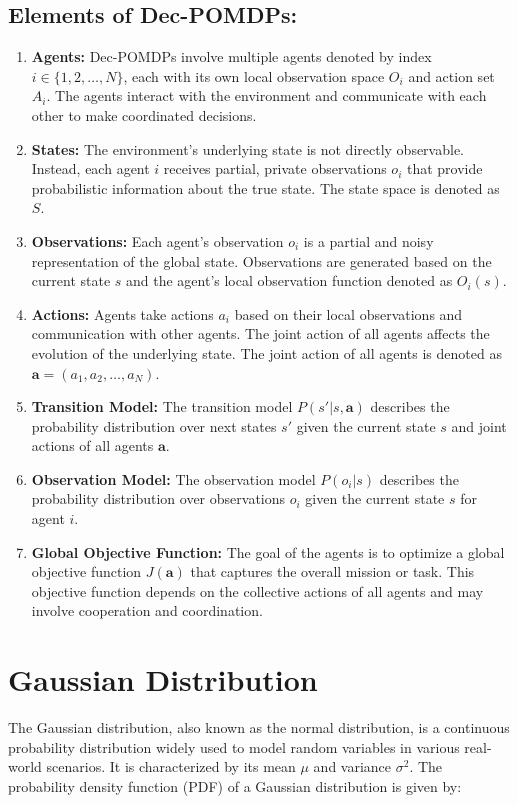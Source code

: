 \subsection{Elements of Dec-POMDPs:}\label{subsec:elements-of-dec-pomdps:}
\begin{enumerate}
    \item \textbf{Agents:} Dec-POMDPs involve multiple agents denoted by index $i \in \{1, 2, \ldots, N\}$, each with its own local observation space $O_i$ and action set $A_i$. The agents interact with the environment and communicate with each other to make coordinated decisions.
    \item \textbf{States:} The environment's underlying state is not directly observable. Instead, each agent $i$ receives partial, private observations $o_i$ that provide probabilistic information about the true state. The state space is denoted as $S$.
    \item \textbf{Observations:} Each agent's observation $o_i$ is a partial and noisy representation of the global state. Observations are generated based on the current state $s$ and the agent's local observation function denoted as $O_i(s)$.
    \item \textbf{Actions:} Agents take actions $a_i$ based on their local observations and communication with other agents. The joint action of all agents affects the evolution of the underlying state. The joint action of all agents is denoted as $\mathbf{a} = (a_1, a_2, \ldots, a_N)$.
    \item \textbf{Transition Model:} The transition model $P(s' | s, \mathbf{a})$ describes the probability distribution over next states $s'$ given the current state $s$ and joint actions of all agents $\mathbf{a}$.
    \item \textbf{Observation Model:} The observation model $P(o_i | s)$ describes the probability distribution over observations $o_i$ given the current state $s$ for agent $i$.
    \item \textbf{Global Objective Function:} The goal of the agents is to optimize a global objective function $J(\mathbf{a})$ that captures the overall mission or task. This objective function depends on the collective actions of all agents and may involve cooperation and coordination.

\end{enumerate}

\section{Gaussian Distribution}\label{sec:gaussian-distribution}
The Gaussian distribution, also known as the normal distribution, is a continuous probability distribution widely used to model random variables in various real-world scenarios. It is characterized by its mean $\mu$ and variance $\sigma^2$. The probability density function (PDF) of a Gaussian distribution is given by:

